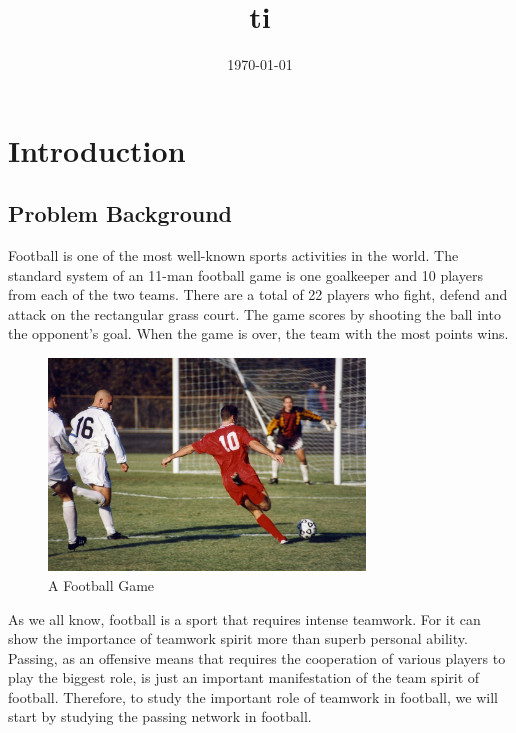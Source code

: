 \documentclass{mcmthesis}
\begin{document}
\linespread{0.6} %
\setlength{\parskip}{0.5\baselineskip} %
\title{ti}

\date{\today}
	\begin{abstract}

	
		\begin{keywords}
		
		\end{keywords}
	\end{abstract}

\maketitle

\tableofcontents

\newpage

\section{Introduction}
\subsection{Problem Background}
	Football is one of the most well-known sports activities in the world.  The standard system of an 11-man football game is one goalkeeper and 10 players from each of the two teams. There are a total of 22 players who fight, defend and attack on the rectangular grass court.  The game scores by shooting the ball into the opponent's goal. When the game is over, the team with the most points wins.

	\begin{figure}[h]
		\centering
		\includegraphics[width=0.75\textwidth]{figures/football.jpg}
		\caption{A Football Game~\cite{Wiki_Football}}
		\label{fig:football}
	\end{figure}

	As we all know, football is a sport that requires intense teamwork.  For it can show the importance of teamwork spirit more than superb personal ability.  Passing, as an offensive means that requires the cooperation of various players to play the biggest role, is just an important manifestation of the team spirit of football.  Therefore, to study the important role of teamwork in football, we will start by studying the passing network in football.
\end{document}
